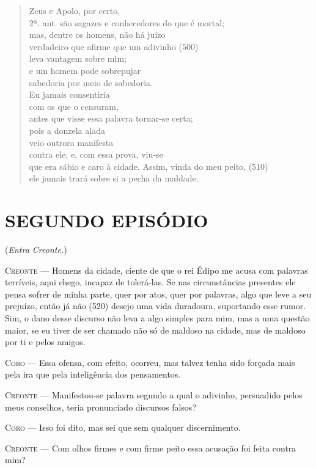 \begin{verse}
Zeus e Apolo, por certo,\\ 2ª. ant.
são sagazes e conhecedores do que é mortal;\\
mas, dentre os homens, não há juízo\\
verdadeiro que afirme que um adivinho (500)\\
leva vantagem sobre mim;\\
e um homem pode sobrepujar\\
sabedoria por meio de sabedoria.\\
Eu jamais consentiria\\
com os que o censuram,\\
antes que visse essa palavra tornar-se certa;\\
pois a donzela alada\\
veio outrora manifesta\\
contra ele, e, com essa prova, viu-se\\
que era sábio e caro à cidade. Assim, vinda do meu peito, (510)\\
ele jamais trará sobre si a pecha da maldade.
\end{verse}

\section{SEGUNDO EPISÓDIO}

(\emph{Entra Creonte.})

\textsc{Creonte} --- Homens da cidade, ciente de que o rei Édipo me acusa com palavras
terríveis, aqui chego, incapaz de tolerá-las. Se nas circunstâncias
presentes ele pensa sofrer de minha parte, quer por atos, quer por
palavras, algo que leve a seu prejuízo, então já não (520) desejo uma
vida duradoura, suportando esse rumor. Sim, o dano desse discurso não
leva a algo simples para mim, mas a uma questão maior, se eu tiver de
ser chamado não só de maldoso na cidade, mas de maldoso por ti e pelos
amigos.

\textsc{Coro} --- Essa ofensa, com efeito, ocorreu, mas talvez tenha sido forçada mais
pela ira que pela inteligência dos pensamentos.

\textsc{Creonte} --- Manifestou-se palavra segundo a qual o adivinho, persuadido pelos meus
conselhos, teria pronunciado discursos falsos?

\textsc{Coro} --- Isso foi dito, mas sei que sem qualquer discernimento.

\textsc{Creonte} --- Com olhos firmes e com firme peito essa acusação foi feita contra mim?

